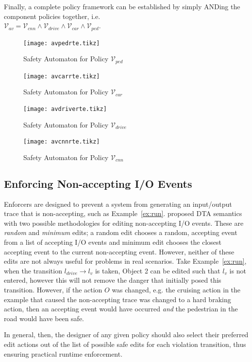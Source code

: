 Finally, a complete policy framework can be established by simply ANDing the component policies together, i.e. \\ $\mathcal{V}_{av} = \mathcal{V}_{cnn} \wedge \mathcal{V}_{drive} \wedge \mathcal{V}_{car} \wedge \mathcal{V}_{ped}$.

\begin{figure}[t]
	\centering
	\texttt{[image: avpedrte.tikz]}
	\caption{Safety Automaton for Policy $\mathcal{V}_{ped}$\label{fig:avpedrte}}
\end{figure}
\begin{figure}[t]
	\centering
	\texttt{[image: avcarrte.tikz]}
	\caption{Safety Automaton for Policy $\mathcal{V}_{car}$\label{fig:avcarrte}}
\end{figure}
\begin{figure}[t]
	\centering
	\texttt{[image: avdriverte.tikz]}
	\caption{Safety Automaton for Policy $\mathcal{V}_{drive}$\label{fig:avdriverte}}
\end{figure}
\begin{figure}[t]
	\centering
	\texttt{[image: avcnnrte.tikz]}
	\caption{Safety Automaton for Policy $\mathcal{V}_{cnn}$\label{fig:avcnnrte}}
\end{figure}


\subsection{Enforcing Non-accepting I/O Events}
Enforcers are designed to prevent a system from generating an input/output trace that is non-accepting, such as Example~\ref{ex:run}.
\cite{recps} proposed \ac{DTA} semantics with two possible methodologies for editing non-accepting I/O events.
These are \textit{random} and \textit{minimum} edits; a random edit chooses a random, accepting event from a list of accepting I/O events and minimum edit chooses the closest accepting event to the current non-accepting event.
However, neither of these edits are not always useful for problems in real scenarios.
Take Example~\ref{ex:run}, when the transition $l_{drive} \rightarrow l_v$ is taken, Object 2 can be edited such that $l_v$ is not entered, however this will not remove the danger that initially posed this transition.
However, if the action ${O}$ was changed, e.g. the cruising action in the example that caused the non-accepting trace was changed to a hard braking action, then an accepting event would have occurred \textit{and} the pedestrian in the road would have been safe.

In general, then, the designer of any given policy should also select their preferred edit actions out of the list of possible safe edits for each violation transition, thus ensuring practical runtime enforcement.

